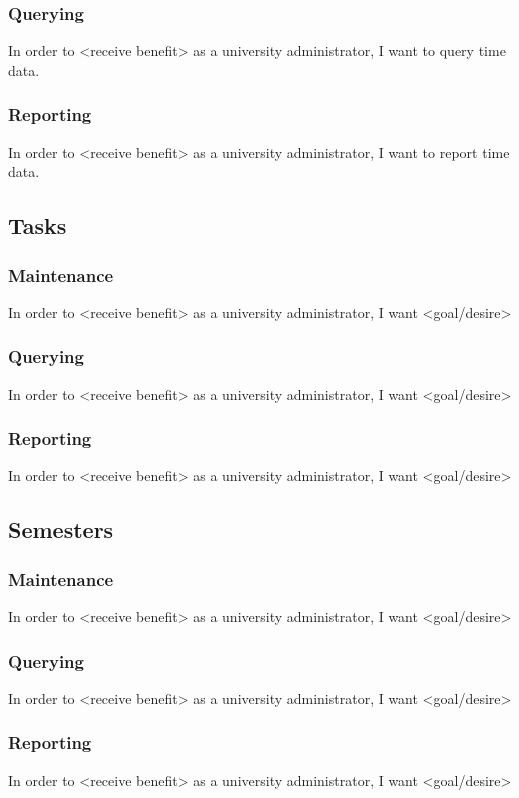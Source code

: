 \subsubsection{Querying}
In order to <receive benefit> as a university administrator, I want to query time data.
\subsubsection{Reporting}
In order to <receive benefit> as a university administrator, I want to report time data.
\subsection{Tasks}
\subsubsection{Maintenance}
In order to <receive benefit> as a university administrator, I want <goal/desire>
\subsubsection{Querying}
In order to <receive benefit> as a university administrator, I want <goal/desire>
\subsubsection{Reporting}
In order to <receive benefit> as a university administrator, I want <goal/desire>
\subsection{Semesters}
\subsubsection{Maintenance}
In order to <receive benefit> as a university administrator, I want <goal/desire>
\subsubsection{Querying}
In order to <receive benefit> as a university administrator, I want <goal/desire>
\subsubsection{Reporting}
In order to <receive benefit> as a university administrator, I want <goal/desire>
